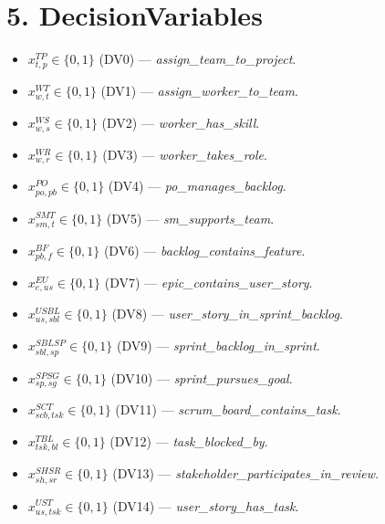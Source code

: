 \documentclass[11pt]{article}
\begin{document}
\section{5. DecisionVariables}
\begin{itemize}
  \item $x^{TP}_{t,p}\in\{0,1\}$ (DV0) — \emph{assign\_team\_to\_project}.
  \item $x^{WT}_{w,t}\in\{0,1\}$ (DV1) — \emph{assign\_worker\_to\_team}.
  \item $x^{WS}_{w,s}\in\{0,1\}$ (DV2) — \emph{worker\_has\_skill}.
  \item $x^{WR}_{w,r}\in\{0,1\}$ (DV3) — \emph{worker\_takes\_role}.
  \item $x^{PO}_{po,pb}\in\{0,1\}$ (DV4) — \emph{po\_manages\_backlog}.
  \item $x^{SMT}_{sm,t}\in\{0,1\}$ (DV5) — \emph{sm\_supports\_team}.
  \item $x^{BF}_{pb,f}\in\{0,1\}$ (DV6) — \emph{backlog\_contains\_feature}.
  \item $x^{EU}_{e,us}\in\{0,1\}$ (DV7) — \emph{epic\_contains\_user\_story}.
  \item $x^{USBL}_{us,sbl}\in\{0,1\}$ (DV8) — \emph{user\_story\_in\_sprint\_backlog}.
  \item $x^{SBLSP}_{sbl,sp}\in\{0,1\}$ (DV9) — \emph{sprint\_backlog\_in\_sprint}.
  \item $x^{SPSG}_{sp,sg}\in\{0,1\}$ (DV10) — \emph{sprint\_pursues\_goal}.
  \item $x^{SCT}_{scb,tsk}\in\{0,1\}$ (DV11) — \emph{scrum\_board\_contains\_task}.
  \item $x^{TBL}_{tsk,bl}\in\{0,1\}$ (DV12) — \emph{task\_blocked\_by}.
  \item $x^{SHSR}_{sh,sr}\in\{0,1\}$ (DV13) — \emph{stakeholder\_participates\_in\_review}.
  \item $x^{UST}_{us,tsk}\in\{0,1\}$ (DV14) — \emph{user\_story\_has\_task}.
\end{itemize}
\end{document}

